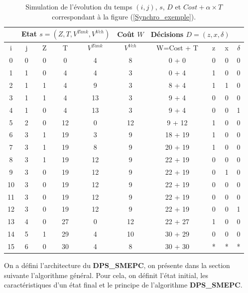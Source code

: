 \begin{table}[H]
	\centering
	\begin{tabular}{|c|c||c|c|c|c||c||c|c|c|}
		\hline
	\rowcolor{cyan}	\multicolumn{2}{|c||}{temps DPS (i,j)}& \multicolumn{4}{|c||}{Etat $s = (Z, T, V^{Tank}, V^{Veh})$}&Coût $ W$ & \multicolumn{3}{|c|}{Décisions $ D = (z, x, \delta )$ } \\
		\hline
		i & j & Z &T & $V^{Tank}$ & $V^{Veh}$&W=Cost + T & z & x&$\delta$ \\ 
		\hline
		0 & 0 & 0 &0 & 4 & 8&0 + 0 & 0 & 0&0 \\ 
		\hline
		1 &1 & 0 &4 & 4 & 3&0 + 4 & 1 & 0&0 \\ 
		\hline
		2 &1 & 1 &4 & 9 & 3&8 + 4 & 1 & 1&0 \\ 
		\hline
		3 &1 & 1 &4 & 13 & 3&9 + 4 & 0 &0&0 \\ 
		\hline
		4 &1 & 0 &4 & 13 & 3&9 + 4 & 0 & 0&1 \\ 
		\hline
		5 &2 & 0 &12 & 0 & 12&9 + 12 & 1 & 0&0 \\ 
		\hline
		6&	3&	1&	19&	3&	9&	18 + 19&	1&	0&	0\\
		\hline
		7&	3&	1&	19&	8&	9&	20 + 19	&1	&0	&0\\
		\hline
		8&	3&	1&	19&	12&	9&	22 + 19	&0	&0	&0\\
		\hline
		9&	3&	0&	19&	12&	9&	22 + 19&	0&	1&	0\\
		\hline
		10&	3&	0&	19&	12&	9&	22 + 19	&0	&0	&0\\
		\hline
		11&	3&	0&	19&	12&	9&	22 + 19&	0&	0&	0\\
		\hline
		12&	3&	0&	19&	12&	9&	22 + 19&	0&	0&	1\\
		\hline
		13&	4&	0&	27&	0&	12&	22 + 27	&1  &0	&0\\
		\hline
		14&	5&	1&	29&	4&	10&	30 + 29	&0&	0	&0\\
		\hline
		15&	6&	0&	30&	4&	8&	30 + 30	&*&	*	&*\\
		\hline
		
	\end{tabular}
	\caption[Simulation de l'évolution du temps DPS]{Simulation de l'évolution du temps $(i,j)$, $s$, $D$ et $Cost + \alpha \times T$ correspondant à la figure (\ref{Synchro_exemple}). }
	\label{Simulation_synchro}
\end{table}

On a défini l'architecture du \textbf{DPS\_SMEPC}, on présente dans la section suivante l'algorithme général. Pour cela, on définit l'état initial, les caractéristiques d'un état final et le principe de l'algorithme \textbf{DPS\_SMEPC}. 

